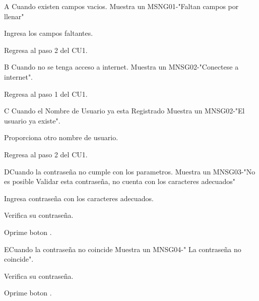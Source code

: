 \begin{UCtrayectoriaA}{A}{ Cuando existen campos vacios.}
  \UCpaso Muestra un MSNG01-"Faltan campos por llenar"
  \item \UCactor Ingresa los campos faltantes.
  \item \UCactor Regresa al paso 2 del CU1.
\end{UCtrayectoriaA}
 
 \begin{UCtrayectoriaA}{B}{ Cuando no se tenga acceso a internet.}
  \UCpaso Muestra un MNSG02-"Conectese a internet".
  \item \UCactor Regresa al paso 1 del CU1.
\end{UCtrayectoriaA}
 
\begin{UCtrayectoriaA}{C}{ Cuando el Nombre de Usuario ya esta Registrado}
  \UCpaso Muestra un MNSG02-"El usuario ya existe".
  \item \UCactor Proporciona otro nombre de usuario.
  \item \UCactor Regresa al paso 2 del CU1.
\end{UCtrayectoriaA}
 
 
\begin{UCtrayectoriaA}{D}{Cuando la contraseña no cumple con los parametros.}
  \UCpaso Muestra un MNSG03-"No es posible Validar esta contraseña, no cuenta con los caracteres adecuados"
  \item \UCactor Ingresa contraseña con los caracteres adecuados.
  \item \UCactor Verifica su contraseña.
  \item \UCactor Oprime boton .
\end{UCtrayectoriaA}

\begin{UCtrayectoriaA}{E}{Cuando la contraseña no coincide}
  \UCpaso Muestra un MNSG04-" La contraseña no coincide".
  \item \UCactor Verifica su contraseña. 
  \item \UCactor Oprime boton .
\end{UCtrayectoriaA}

